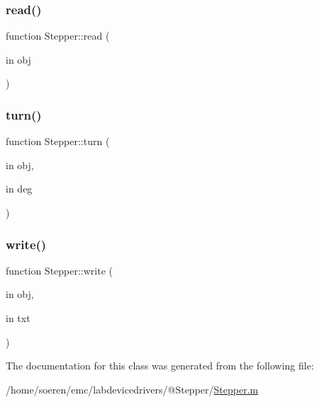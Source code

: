 \mbox{\label{class_stepper_a4bce363f98e8f973e67bbdcd9517b430}} 
\subsubsection{\texorpdfstring{read()}{read()}}
{\footnotesize\ttfamily function Stepper\+::read (\begin{DoxyParamCaption}\item[{in}]{obj }\end{DoxyParamCaption})}

\mbox{\label{class_stepper_a59922bf2f911a664e791ae9ef74bb983}} 
\subsubsection{\texorpdfstring{turn()}{turn()}}
{\footnotesize\ttfamily function Stepper\+::turn (\begin{DoxyParamCaption}\item[{in}]{obj,  }\item[{in}]{deg }\end{DoxyParamCaption})}

\mbox{\label{class_stepper_ada9181b2569a0d9235abeac683133384}} 
\subsubsection{\texorpdfstring{write()}{write()}}
{\footnotesize\ttfamily function Stepper\+::write (\begin{DoxyParamCaption}\item[{in}]{obj,  }\item[{in}]{txt }\end{DoxyParamCaption})}



The documentation for this class was generated from the following file\+:\begin{DoxyCompactItemize}
\item 
/home/soeren/emc/labdevicedrivers/@\+Stepper/\hyperlink{_stepper_8m}{Stepper.\+m}\end{DoxyCompactItemize}
